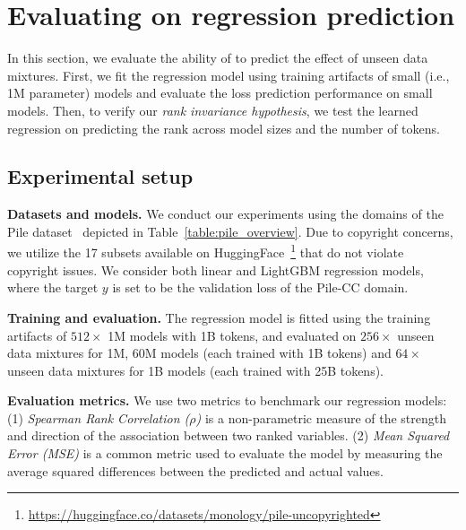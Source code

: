 \section{Evaluating on regression prediction}

\label{sec:evaluate_regression}

In this section, we evaluate the ability of \ourmethod to predict the effect of unseen data mixtures.
First, we fit the regression model using training artifacts of small (i.e., 1M parameter) models and evaluate the loss prediction performance on small models.
Then, to verify our \textit{rank invariance hypothesis}, we test the learned regression on predicting the rank across model sizes and the number of tokens.


\subsection{Experimental setup}

\textbf{Datasets and models.}\;\;
We conduct our experiments using the domains of the Pile dataset~\citep{the_pile_corpus} depicted in Table~\ref{table:pile_overview}.
Due to copyright concerns, we utilize the 17 subsets available on HuggingFace~\footnote{\url{https://huggingface.co/datasets/monology/pile-uncopyrighted}} that do not violate copyright issues.
We consider both linear and LightGBM regression models, where the target $y$ is set to be the validation loss of the Pile-CC domain.

\textbf{Training and evaluation.}\;\;
The regression model is fitted using the training artifacts of $512 \times$ 1M models with 1B tokens, and evaluated on $256 \times$ unseen data mixtures for 1M, 60M models (each trained with 1B tokens) and $64 \times$ unseen data mixtures for 1B models (each trained with 25B tokens).

\textbf{Evaluation metrics.}\;\;
We use two metrics to benchmark our regression models: (1) \textit{Spearman Rank Correlation ($\rho$)} is a non-parametric measure of the strength and direction of the association between two ranked variables. (2) \textit{Mean Squared Error (MSE)} is a common metric used to evaluate the model by measuring the average squared differences between the predicted and actual values.

